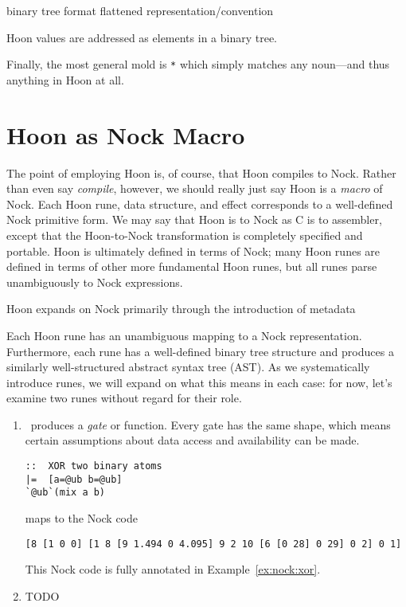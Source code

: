 binary tree format
flattened representation/convention


Hoon values are addressed as elements in a binary tree.


Finally, the most general mold is \texttt{*} which simply matches any noun—and thus anything in Hoon at all.

\section{Hoon as Nock Macro}

The point of employing Hoon is, of course, that Hoon compiles to Nock.  Rather than even say \emph{compile}, however, we should really just say Hoon is a \emph{macro} of Nock.  Each Hoon rune, data structure, and effect corresponds to a well-defined Nock primitive form.  We may say that Hoon is to Nock as C is to assembler, except that the Hoon-to-Nock transformation is completely specified and portable.  Hoon is ultimately defined in terms of Nock; many Hoon runes are defined in terms of other more fundamental Hoon runes, but all runes parse unambiguously to Nock expressions.


Hoon expands on Nock primarily through the introduction of metadata


Each Hoon rune has an unambiguous mapping to a Nock representation.  Furthermore, each rune has a well-defined binary tree structure and produces a similarly well-structured abstract syntax tree (AST).  As we systematically introduce runes, we will expand on what this means in each case:  for now, let's examine two runes without regard for their role.

\begin{enumerate}
  \item  \pbartis~produces a \emph{gate} or function.  Every gate has the same shape, which means certain assumptions about data access and availability can be made.

    \begin{lstlisting}
::  XOR two binary atoms
|=  [a=@ub b=@ub]
`@ub`(mix a b)
    \end{lstlisting}

    maps to the Nock code

    \begin{lstlisting}
[8 [1 0 0] [1 8 [9 1.494 0 4.095] 9 2 10 [6 [0 28] 0 29] 0 2] 0 1]
    \end{lstlisting}

    This Nock code is fully annotated in Example~\ref{ex:nock:xor}.

  \item  TODO
\end{enumerate}


